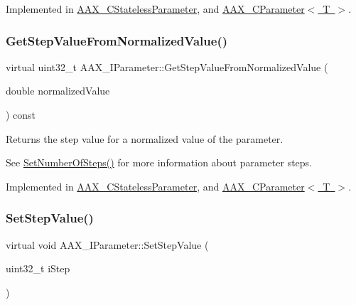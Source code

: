Implemented in \mbox{\hyperlink{a01541_a26577262d2c31f5c62a3aa1f768199ce}{A\+A\+X\+\_\+\+C\+Stateless\+Parameter}}, and \mbox{\hyperlink{a01537_aa2ad88cfd15eae17f5ec18027e738950}{A\+A\+X\+\_\+\+C\+Parameter$<$ T $>$}}.

\mbox{\label{a01857_a5ff847bf1730bda6c91189aba8969557}} 
\subsubsection{\texorpdfstring{GetStepValueFromNormalizedValue()}{GetStepValueFromNormalizedValue()}}
{\footnotesize\ttfamily virtual uint32\+\_\+t A\+A\+X\+\_\+\+I\+Parameter\+::\+Get\+Step\+Value\+From\+Normalized\+Value (\begin{DoxyParamCaption}\item[{double}]{normalized\+Value }\end{DoxyParamCaption}) const\hspace{0.3cm}{\ttfamily [pure virtual]}}



Returns the step value for a normalized value of the parameter. 

See \mbox{\hyperlink{a01857_ac81903d0388a03045a57dd4c455b6f02}{Set\+Number\+Of\+Steps()}} for more information about parameter steps. 

Implemented in \mbox{\hyperlink{a01541_a14bbab3f603a2731518d7936eebdea4e}{A\+A\+X\+\_\+\+C\+Stateless\+Parameter}}, and \mbox{\hyperlink{a01537_ab6b9451a0dee2caa12829b1e7fca856b}{A\+A\+X\+\_\+\+C\+Parameter$<$ T $>$}}.

\mbox{\label{a01857_a9f92e51fce44dbf25a7265286c72d0ea}} 
\subsubsection{\texorpdfstring{SetStepValue()}{SetStepValue()}}
{\footnotesize\ttfamily virtual void A\+A\+X\+\_\+\+I\+Parameter\+::\+Set\+Step\+Value (\begin{DoxyParamCaption}\item[{uint32\+\_\+t}]{i\+Step }\end{DoxyParamCaption})\hspace{0.3cm}{\ttfamily [pure virtual]}}



